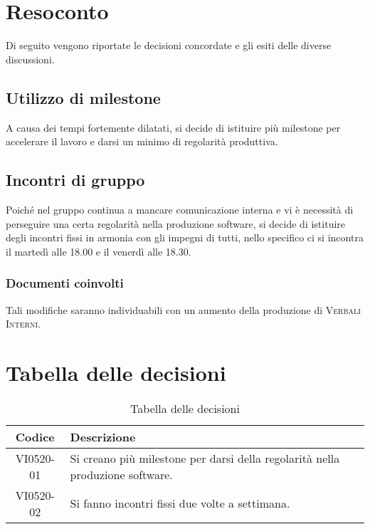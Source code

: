 \documentclass{article}
\begin{document}
\newpage
\section{Resoconto}
\label{sec:resoconto}

Di seguito vengono riportate le decisioni concordate e gli esiti delle diverse discussioni.

\subsection{Utilizzo di milestone}
\label{itm:1}

A causa dei tempi fortemente dilatati, si decide di istituire più milestone per accelerare il lavoro e darsi un minimo di regolarità produttiva.

\subsection{Incontri di gruppo}
\label{itm:2}

Poiché nel gruppo continua a mancare comunicazione interna e vi è necessità di perseguire una certa regolarità nella produzione software, si decide di istituire degli
incontri fissi in armonia con gli impegni di tutti, nello specifico ci si incontra il martedì alle 18.00 e il venerdì alle 18.30.
\subsubsection*{Documenti coinvolti}
Tali modifiche saranno individuabili con un aumento della produzione di \textsc{Verbali Interni}.


\section{Tabella delle decisioni}%
\label{sub:decisioni}

\begin{table}[!ht]
	\centering
	\begin{tabular}{|c|p{13cm}|}
		\hline
		\rowcolor{lightgray}
		\textbf{Codice} & \textbf{Descrizione} \\
		\hline
			VI0520-01 & Si creano più milestone per darsi della regolarità nella produzione software. \\
            VI0520-02 & Si fanno incontri fissi due volte a settimana. \\
		\hline
	\end{tabular}
	\caption{Tabella delle decisioni}
\end{table}
\end{document}
